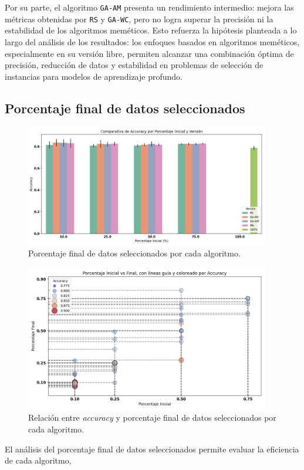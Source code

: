 Por su parte, el algoritmo \texttt{GA-AM} presenta un rendimiento intermedio: mejora las métricas obtenidas por \texttt{RS} y \texttt{GA-WC},
pero no logra superar la precisión ni la estabilidad de los algoritmos meméticos.
Esto refuerza la hipótesis planteada a lo largo del análisis de los resultados: los enfoques basados en algoritmos meméticos,
especialmente en su versión libre, permiten alcanzar una combinación óptima de precisión,
reducción de datos y estabilidad en problemas de selección de instancias para modelos de aprendizaje profundo.

\subsection{Porcentaje final de datos seleccionados}\label{sec:porcentaje-final-datos-seleccionados}
\begin{figure}[htp]
    \centering
    \includegraphics[width=0.95\textwidth]{imagenes/evaluaciones/final/barplot-por-porcentaje.png}
    \caption{Porcentaje final de datos seleccionados por cada algoritmo.}
    \label{fig:barplot-por-porcentaje}
\end{figure}
\begin{figure}[htp]
    \centering
    \includegraphics[width=0.95\textwidth]{imagenes/evaluaciones/final/scatter.png}
    \caption{Relación entre \textit{accuracy} y porcentaje final de datos seleccionados por cada algoritmo.}
    \label{fig:scatter-final}
\end{figure}El análisis del porcentaje final de datos seleccionados permite evaluar la eficiencia de cada algoritmo,
